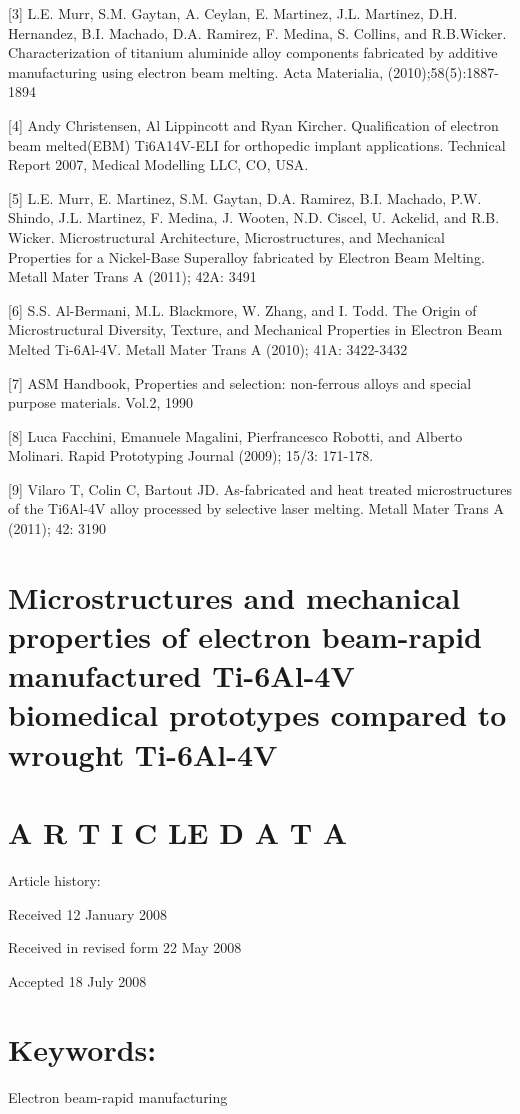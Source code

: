 \documentclass[10pt]{article}
\begin{document}
[3] L.E. Murr, S.M. Gaytan, A. Ceylan, E. Martinez, J.L. Martinez, D.H. Hernandez, B.I. Machado, D.A. Ramirez, F. Medina, S. Collins, and R.B.Wicker. Characterization of titanium aluminide alloy components fabricated by additive manufacturing using electron beam melting. Acta Materialia, (2010);58(5):1887-1894

[4] Andy Christensen, Al Lippincott and Ryan Kircher. Qualification of electron beam melted(EBM) Ti6A14V-ELI for orthopedic implant applications. Technical Report 2007, Medical Modelling LLC, CO, USA.

[5] L.E. Murr, E. Martinez, S.M. Gaytan, D.A. Ramirez, B.I. Machado, P.W. Shindo, J.L. Martinez, F. Medina, J. Wooten, N.D. Ciscel, U. Ackelid, and R.B. Wicker. Microstructural Architecture, Microstructures, and Mechanical Properties for a Nickel-Base Superalloy fabricated by Electron Beam Melting. Metall Mater Trans A (2011); 42A: 3491

[6] S.S. Al-Bermani, M.L. Blackmore, W. Zhang, and I. Todd. The Origin of Microstructural Diversity, Texture, and Mechanical Properties in Electron Beam Melted Ti-6Al-4V. Metall Mater Trans A (2010); 41A: 3422-3432

[7] ASM Handbook, Properties and selection: non-ferrous alloys and special purpose materials. Vol.2, 1990

[8] Luca Facchini, Emanuele Magalini, Pierfrancesco Robotti, and Alberto Molinari. Rapid Prototyping Journal (2009); 15/3: 171-178.

[9] Vilaro T, Colin C, Bartout JD. As-fabricated and heat treated microstructures of the Ti6Al-4V alloy processed by selective laser melting. Metall Mater Trans A (2011); 42: 3190

\section*{Microstructures and mechanical properties of electron beam-rapid manufactured Ti-6Al-4V biomedical prototypes compared to wrought Ti-6Al-4V }


\section*{A R T I C LE D A T A}
Article history:

Received 12 January 2008

Received in revised form 22 May 2008

Accepted 18 July 2008

\section*{Keywords:}
Electron beam-rapid manufacturing
\end{document}
